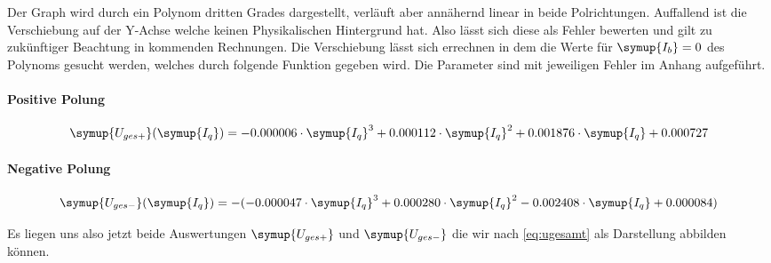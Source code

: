 Der Graph wird durch ein Polynom dritten Grades dargestellt, verläuft aber annähernd linear in beide Polrichtungen. Auffallend ist die Verschiebung auf der Y-Achse %
welche keinen Physikalischen Hintergrund hat. Also lässt sich diese als Fehler bewerten und gilt zu zukünftiger Beachtung in kommenden Rechnungen.
Die Verschiebung lässt sich errechnen in dem die Werte für $\symup{I_b}=0$ des Polynoms gesucht werden, welches durch folgende Funktion gegeben wird.  
Die Parameter sind mit jeweiligen Fehler im Anhang aufgeführt.  

\paragraph{Positive Polung}
\begin{equation}
   \symup{U_{ges+}}(\symup{I_q})=-0.000006 \cdot \symup{I_q}^3 + 0.000112\cdot\symup{I_q}^2 + 0.001876 \cdot\symup{I_q} + 0.000727 
\end{equation}

\paragraph{Negative Polung} 
\begin{equation}
   \symup{U_{ges-}}(\symup{I_q})=-(-0.000047 \cdot \symup{I_q}^3 + 0.000280\cdot\symup{I_q}^2 -0.002408\cdot\symup{I_q} + 0.000084)
\end{equation}

%
%

Es liegen uns also jetzt beide Auswertungen $\symup{U_{ges+}}$ und $\symup{U_{ges-}}$ die wir nach \eqref{eq:ugesamt} als Darstellung abbilden können.


